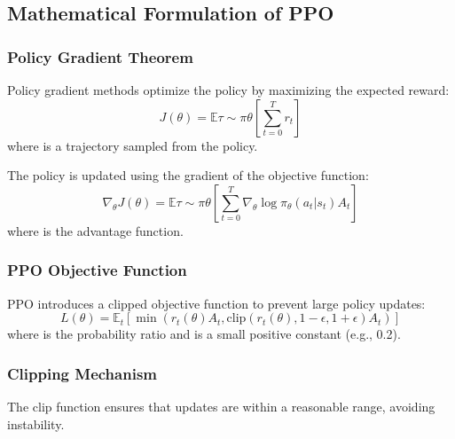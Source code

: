 \documentclass[11pt]{article}
\begin{document}
\subsection{Mathematical Formulation of PPO}

\subsubsection{Policy Gradient Theorem}
Policy gradient methods optimize the policy  by maximizing the expected reward:
\begin{equation}
	J(\theta) = \mathbb{E}{\tau \sim \pi{\theta}} \left[ \sum_{t=0}^{T} r_t \right]
\end{equation}
where  is a trajectory sampled from the policy.

The policy is updated using the gradient of the objective function:
\begin{equation}
	\nabla_\theta J(\theta) = \mathbb{E}{\tau \sim \pi\theta} \left[ \sum_{t=0}^{T} \nabla_\theta \log \pi_\theta(a_t | s_t) A_t \right]
\end{equation}
where  is the advantage function.

\subsubsection{PPO Objective Function}
PPO introduces a clipped objective function to prevent large policy updates:
\begin{equation}
	L(\theta) = \mathbb{E}_t \left[ \min(r_t(\theta) A_t, \text{clip}(r_t(\theta), 1 - \epsilon, 1 + \epsilon) A_t) \right]
\end{equation}
where  is the probability ratio and  is a small positive constant (e.g., 0.2).

\subsubsection{Clipping Mechanism}
The clip function ensures that updates are within a reasonable range, avoiding instability.
\end{document}
